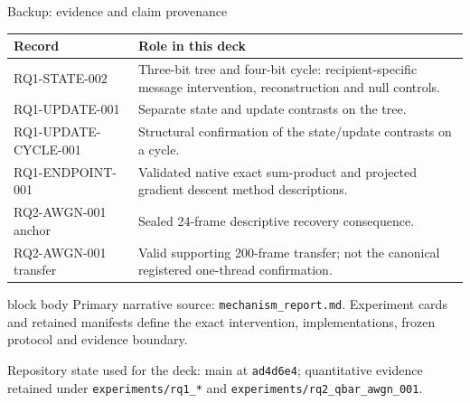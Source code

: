 \documentclass[aspectratio=169,9pt,t]{beamer}
\newcommand{\scopebox}[1]{%
  \begin{beamercolorbox}[rounded=true,sep=1.3ex]{block body}
    \small #1
  \end{beamercolorbox}}
\begin{document}
\begin{frame}{Backup: evidence and claim provenance}
  \small
  \renewcommand{\arraystretch}{1.25}
  \begin{tabularx}{\textwidth}{>{\ttfamily}p{4.0cm}X}
    \toprule
    \normalfont\textbf{Record} & \textbf{Role in this deck}\\
    \midrule
    RQ1-STATE-002 & Three-bit tree and four-bit cycle: recipient-specific message intervention, reconstruction and null controls.\\
    RQ1-UPDATE-001 & Separate state and update contrasts on the tree.\\
    RQ1-UPDATE-CYCLE-001 & Structural confirmation of the state/update contrasts on a cycle.\\
    RQ1-ENDPOINT-001 & Validated native exact sum-product and projected gradient descent method descriptions.\\
    RQ2-AWGN-001 anchor & Sealed 24-frame descriptive recovery consequence.\\
    RQ2-AWGN-001 transfer & Valid supporting 200-frame transfer; not the canonical registered one-thread confirmation.\\
    \bottomrule
  \end{tabularx}

  \vspace{4mm}
  \scopebox{Primary narrative source: \texttt{mechanism\_report.md}. Experiment cards and retained manifests define the exact intervention, implementations, frozen protocol and evidence boundary.}

  \vspace{3mm}
  {\scriptsize\color{Muted}Repository state used for the deck: main at \texttt{ad4d6e4}; quantitative evidence retained under \texttt{experiments/rq1\_*} and \texttt{experiments/rq2\_qbar\_awgn\_001}.}
\end{frame}
\end{document}
